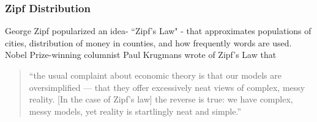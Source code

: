 \documentclass[MAIN.tex]{subfiles}
\begin{document}
\begin{frame}
\frametitle{Zipf Distribution}
\large

George Zipf popularized an idea- ``Zipf’s Law" - that approximates populations of cities, distribution of money in counties, and how frequently words are used.\\ \bigskip Nobel Prize-winning columnist Paul Krugmans wrote of Zipf’s Law that
\begin{quote}
“the usual complaint about economic theory is that our models are oversimplified — that they offer excessively neat views of complex, messy reality. [In the case of Zipf’s law] the reverse is true: we have complex, messy models, yet reality is startlingly neat and simple.”

\end{quote}


\end{frame}
\end{document}
